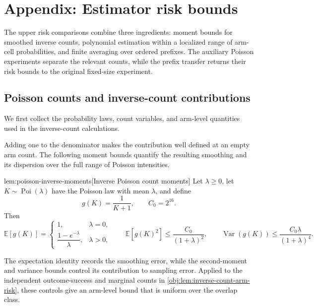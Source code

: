 \section{Appendix: Estimator risk bounds}

The upper risk comparisons combine three ingredients: moment bounds for smoothed inverse counts, polynomial estimation within a localized range of arm-cell probabilities, and finite averaging over ordered prefixes. The auxiliary Poisson experiments separate the relevant counts, while the prefix transfer returns their risk bounds to the original fixed-size experiment.

\subsection{Poisson counts and inverse-count contributions}

We first collect the probability laws, count variables, and arm-level quantities used in the inverse-count calculations.



Adding one to the denominator makes the contribution well defined at an empty arm count. The following moment bounds quantify the resulting smoothing and its dispersion over the full range of Poisson intensities.

\begin{lemmav}{lem:poisson-inverse-moments}[Inverse Poisson count moments]
Let \(\lambda\ge 0\), let \(K\sim\operatorname{Poi}(\lambda)\) have the Poisson law with mean \(\lambda\), and define
\[
g(K)=\frac{1}{K+1},
\qquad C_0=2^{16}.
\]
Then
\[
\mathbb E[g(K)]
=
\begin{cases}
1,&\lambda=0,\\
\dfrac{1-e^{-\lambda}}{\lambda},&\lambda>0,
\end{cases}
\qquad
\mathbb E[g(K)^2]\le \frac{C_0}{(1+\lambda)^2},
\qquad
\operatorname{Var}(g(K))\le \frac{C_0\lambda}{(1+\lambda)^4}.
\]
\end{lemmav}

The expectation identity records the smoothing error, while the second-moment and variance bounds control its contribution to sampling error. Applied to the independent outcome-success and marginal counts in \cref{obj:lem:inverse-count-arm-risk}, these controls give an arm-level bound that is uniform over the overlap class.

